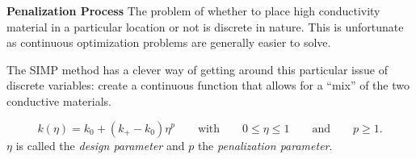 \documentclass[final]{beamer}
\begin{document}
\begin{frame}{\textbf{Penalization Process}}
	The problem of whether to place high conductivity material in a particular location or not is discrete in nature. This is unfortunate as continuous optimization problems are generally easier to solve.\vfill\pause
	
	The SIMP method has a clever way of getting around this particular issue of discrete variables: create a continuous function that allows for a ``mix'' of the two conductive materials.\pause
	
	\begin{equation}
		k\left(\eta\right)=k_0+\left(k_+-k_0\right)\eta^p\qquad\text{with}\qquad 0\leq\eta\leq 1\qquad\text{and}\qquad p\geq1.\label{eqn:penalization}
	\end{equation}
	$\eta$ is called the \textit{design parameter} and $p$ the \textit{penalization parameter}.
\end{frame}

\end{document}
